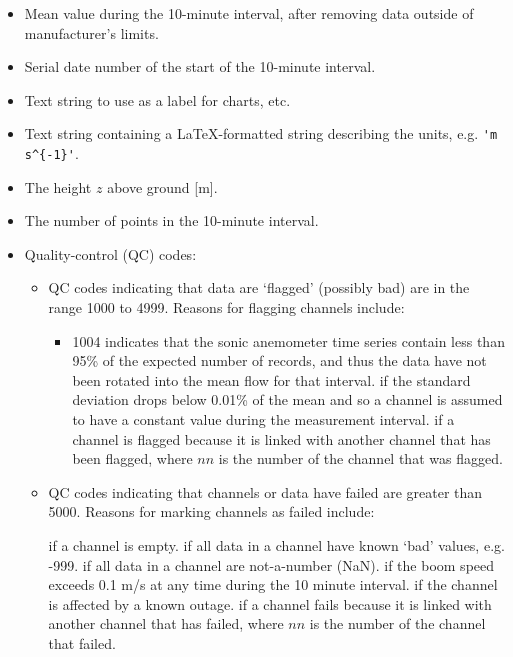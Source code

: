 \begin{itemize}
\item {} Mean value during the 10-minute interval, after removing data outside of manufacturer's limits.
\item {} Serial date number of the start of the 10-minute interval.
\item {} Text string to use as a label for charts, etc.
\item {} Text string containing a \LaTeX-formatted string describing the units, e.g. \verb+'m s^{-1}'+.
\item {} The height $z$ above ground [m].
\item {} The number of points in the 10-minute interval.
\item {} Quality-control (QC) codes:
\begin{itemize}
\item QC codes indicating that data are `flagged' (possibly bad) are in the range 1000 to 4999. Reasons for flagging channels include:
\begin{itemize}
 irregular timing. The period between measurements should be 0.05 seconds at a data acquisition rate of 20 Hz. If more than 1\% of data are more than 5\% from the ideal period, this QC code is set.
 If the number of points within the manufacturer's limits or users' limits is below a threshold set in the configuration file. These threshold values are the  rate (QC code 1002) and the  rate (QC code 1003).
\item {1004} indicates that the sonic anemometer time series contain less than 95\% of the expected number of records, and thus the data have not been rotated into the mean flow for that interval.
 if the standard deviation drops below 0.01\% of the mean and so a channel is assumed to have a constant value during the measurement interval.
 if a channel is flagged because it is linked with another channel that has been flagged, where $nn$ is the number of the channel that was flagged.

\end{itemize}
\item QC codes indicating that channels or data have failed are greater than 5000. Reasons for marking channels as failed include:
\begin{itemize}
 if a channel is empty.
 if all data in a channel have known `bad' values, e.g. -999.
 if all data in a channel are not-a-number (NaN).
 if the boom speed exceeds 0.1 m/s at any time during the 10 minute interval.
 if the channel is affected by a known outage.
 if a channel fails because it is linked with another channel that has failed, where $nn$ is the number of the channel that failed.
\end{itemize}
\end{itemize}
\end{itemize}

